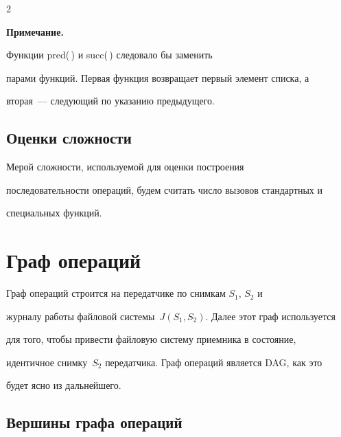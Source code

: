 \begin{multicols}{2}
      


      \smallskip





      \noindent


{\sf \textbf{Примечание.}\


 Функции pred(\,) и succ(\,) следовало бы заменить 


парами функций. Первая функция возвращает первый элемент списка, а 


вторая~--- следующий по указанию предыдущего.}


      


\subsection{Оценки сложности }





      Мерой сложности, используемой для оценки построения 


последовательности операций, будем считать число вызовов стандартных и 


специальных функций.





\section{Граф операций}





      Граф операций строится на передатчике по снимкам $S_1$, $S_2$ и 


журналу работы файловой сис\-те\-мы~$J(S_1, S_2)$. Далее этот граф используется 


для того, чтобы привести файловую систему приемника в состояние, 


идентичное снимку~$S_2$ передатчика. Граф операций является DAG, как это 


будет ясно из дальнейшего.





\vspace*{-3pt}


\subsection{Вершины графа операций}



\end{multicols}
